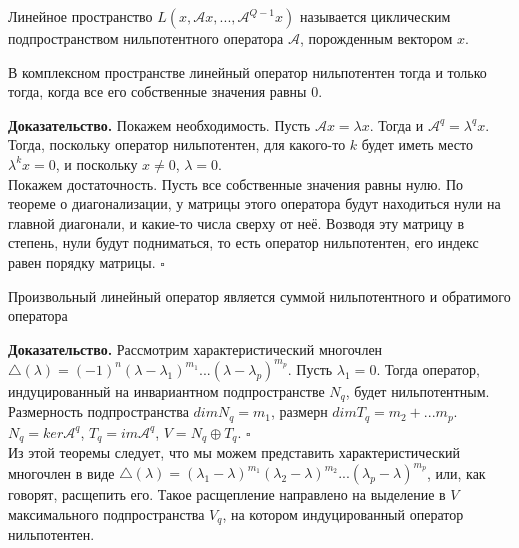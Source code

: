 \begin{defin}
Линейное пространство $L(x,\mathcal Ax,...,\mathcal A^{Q-1}x)$ называется 
циклическим подпространством нильпотентного оператора $\mathcal A$, порожденным
вектором $x$.
\end{defin}

\begin{theor}
В комплексном пространстве линейный оператор нильпотентен тогда и только
тогда, когда все его собственные значения равны 0.
\end{theor}
\textbf{Доказательство.} Покажем необходимость. Пусть $\mathcal Ax=\lambda x$.
Тогда и $\mathcal A^q=\lambda^qx$. Тогда, поскольку оператор нильпотентен, для
какого-то $k$ будет иметь место
$\lambda^kx=0$, и поскольку $x\ne0$, $\lambda=0$.\\ Покажем достаточность.
Пусть все собственные значения равны нулю. По теореме о диагонализации, у 
матрицы этого оператора будут находиться нули на
главной диагонали, и какие-то числа сверху от неё. Возводя эту матрицу в 
степень, нули будут подниматься, то есть оператор нильпотентен, его индекс 
равен порядку матрицы. $\square$
\begin{theor}
Произвольный линейный оператор является суммой нильпотентного и обратимого 
оператора
\end{theor}
\textbf{Доказательство.} Рассмотрим характеристический многочлен
$\triangle(\lambda)=(-1)^{n}(\lambda-\lambda_1)^{m_1}...(\lambda-\lambda_p)
^{m_p}$. Пусть $\lambda_1=0$. Тогда оператор, индуцированный на инвариантном 
подпространстве $N_q$, будет нильпотентным. Размерность подпространства
$dimN_q=m_1$, размерн $dimT_q=m_2+...m_p$. $N_q=ker\mathcal A^q$, 
$T_q=im\mathcal A^q$, $V=N_q\oplus T_q$. $\square$\\
Из этой теоремы следует, что мы можем представить характеристический многочлен
в виде $\triangle(\lambda)=(\lambda_1-\lambda)^{m_1}(\lambda_2-\lambda)^
{m_2}...(\lambda_p-\lambda)^{m_p}$, или, как говорят, расщепить его. Такое
расщепление направлено на выделение в $V$ максимального подпространства $V_q$,
на котором индуцированный оператор нильпотентен.



